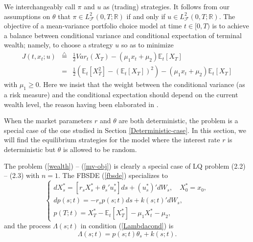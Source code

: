 \documentclass[final]{siamltex}
\begin{document}
We interchangeably call $\pi$ and $u$ as (trading) strategies. It follows from our assumptions on $\theta$ that 
$\pi\in L_{{\mathcal F}}^{2}(0,T; {\mathbb{R}})$ if and only if $u\in L_{{\mathcal F}}^{2}(0,T; {\mathbb{R}})$. 
The objective of a mean-variance portfolio choice model  at time $t\in [0, T)$ is to achieve a balance between
conditional variance and conditional expectation of terminal wealth; namely, to choose a strategy $u$ so as to minimize
\begin{eqnarray}\label{mv-obj}
J(t, x_t; u)&{\stackrel{\triangle}{=}} &\frac{1}{2}Var_t(X_T)-(\mu_1 x_t+\mu_2) \mathbb E_t[X_T]\\
&=&\frac{1}{2}\left(\mathbb E_t[X_T^2]-(\mathbb E_t[X_T])^2\right)-(\mu_1 x_t+\mu_2) \mathbb E_t[X_T]\nonumber
\end{eqnarray}
with $\mu_1\ge 0$.
Here we insist that the weight between the conditional variance (as a risk measure) and the
conditional expectation should depend on the current wealth level, the reason having been elaborated in \cite{BMZ}.

When  the market parameters $r$ and $\theta$ are both deterministic, the problem is a special case of the one studied in
Section \ref{Deterministic-case}. In this section, we will find the equilibrium strategies for the model
where the  interest rate $r$ is deterministic but $\theta$ is  allowed to be random.

The problem (\ref{wealth}) --  (\ref{mv-obj}) is clearly a special case of LQ problem  (2.2) -- (2.3) with $n=1$.
The FBSDE (\ref{fbsde}) specializes  to
\begin{equation}\label{fbsderand}
\left\{
\begin{array}{l}
dX^*_s=[r_s X^*_s+\theta_s' u^*_s]ds+ (u^*_s)'dW_s,\quad X_0^*=x_0,\\
dp(s;t)=-r_s p(s;t)ds+k(s;t)'dW_s,\\
p(T;t)=X^*_T-\mathbb E_t[X^*_T]-\mu_1X^*_t-\mu_2,
\end{array}\right.
\end{equation}
and the process $\Lambda(s;t)$ in condition (\ref{Lambdacond}) is
$$\Lambda(s;t)=p(s;t)\theta_s+k(s;t).$$
\end{document}
